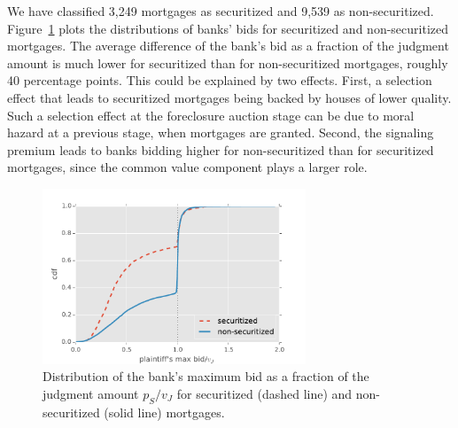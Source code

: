 \documentclass[11pt,twopage]{article}
\begin{document}
We have classified 3,249 mortgages as securitized and 9,539 as non-securitized. Figure~\ref{fig:distr-maxbid-sec-nonsec} plots the distributions of banks' bids for securitized and non-securitized mortgages. The average difference of the bank's bid as a fraction of the judgment amount is much lower for securitized than for non-securitized mortgages, roughly 40 percentage points. This could be explained by two effects. First, a selection
effect that leads to securitized mortgages being backed by houses of
lower quality. Such a selection effect at the foreclosure auction
stage can be due to moral hazard at a previous stage, when mortgages
are granted. Second, the signaling premium leads to banks bidding
higher for non-securitized than for securitized mortgages, since the
common value component plays a larger role.

\begin{figure}
	\begin{center}
		\includegraphics[width=0.7\textwidth]{graphics/distr-maxbid-sec-nonsec}
		\caption{Distribution of the bank's maximum bid as a fraction of the judgment amount $p_S/v_J$ for securitized (dashed line) and non-securitized (solid line) mortgages.\label{fig:distr-maxbid-sec-nonsec}}
	\end{center}
\end{figure}
\end{document}
